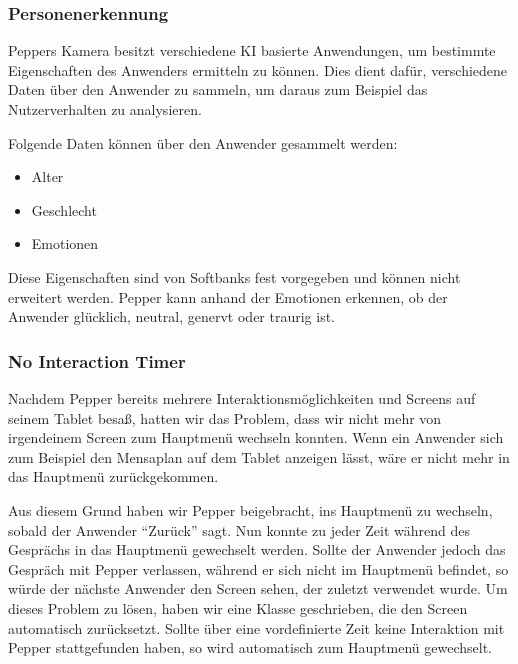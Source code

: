 \subsubsection{Personenerkennung}

Peppers Kamera besitzt verschiedene KI basierte Anwendungen, um bestimmte Eigenschaften des Anwenders ermitteln zu können. Dies dient dafür, verschiedene Daten über den Anwender zu sammeln, um daraus zum Beispiel das Nutzerverhalten zu analysieren.

Folgende Daten können über den Anwender gesammelt werden:
\begin{itemize}
    \item Alter
    \item Geschlecht
    \item Emotionen
\end{itemize}

Diese Eigenschaften sind von Softbanks fest vorgegeben und können nicht erweitert werden. Pepper kann anhand der Emotionen erkennen, ob der Anwender glücklich, neutral, genervt oder traurig ist.\\

\subsubsection{No Interaction Timer}

Nachdem Pepper bereits mehrere Interaktionsmöglichkeiten und Screens auf seinem Tablet besaß, hatten wir das Problem, dass wir nicht mehr von irgendeinem Screen zum Hauptmenü wechseln konnten. Wenn ein Anwender sich zum Beispiel den Mensaplan auf dem Tablet anzeigen lässt, wäre er nicht mehr in das Hauptmenü zurückgekommen. 

Aus diesem Grund haben wir Pepper beigebracht, ins Hauptmenü zu wechseln, sobald der Anwender ``Zurück'' sagt. Nun konnte zu jeder Zeit während des Gesprächs in das Hauptmenü gewechselt werden. Sollte der Anwender jedoch das Gespräch mit Pepper verlassen, während er sich nicht im Hauptmenü befindet, so würde der nächste Anwender den Screen sehen, der zuletzt verwendet wurde. 
Um dieses Problem zu lösen, haben wir eine Klasse geschrieben, die den Screen automatisch zurücksetzt.
Sollte über eine vordefinierte Zeit keine Interaktion mit Pepper stattgefunden haben, so wird automatisch zum Hauptmenü gewechselt.